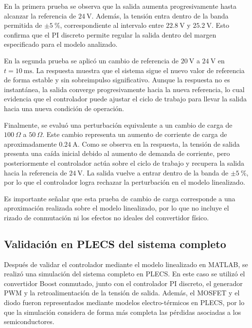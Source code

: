 \documentclass[conference]{IEEEtran}
\begin{document}
En la primera prueba se observa que la salida aumenta progresivamente hasta alcanzar la referencia de $24~\mathrm{V}$. Además, la tensión entra dentro de la banda permitida de $\pm 5~\%$, correspondiente al intervalo entre $22.8~\mathrm{V}$ y $25.2~\mathrm{V}$. Esto confirma que el PI discreto permite regular la salida dentro del margen especificado para el modelo analizado.

En la segunda prueba se aplicó un cambio de referencia de $20~\mathrm{V}$ a $24~\mathrm{V}$ en $t=10~\mathrm{ms}$. La respuesta muestra que el sistema sigue el nuevo valor de referencia de forma estable y sin sobreimpulso significativo. Aunque la respuesta no es instantánea, la salida converge progresivamente hacia la nueva referencia, lo cual evidencia que el controlador puede ajustar el ciclo de trabajo para llevar la salida hacia una nueva condición de operación.

Finalmente, se evaluó una perturbación equivalente a un cambio de carga de $100~\Omega$ a $50~\Omega$. Este cambio representa un aumento de corriente de carga de aproximadamente $0.24~\mathrm{A}$. Como se observa en la respuesta, la tensión de salida presenta una caída inicial debido al aumento de demanda de corriente, pero posteriormente el controlador actúa sobre el ciclo de trabajo y recupera la salida hacia la referencia de $24~\mathrm{V}$. La salida vuelve a entrar dentro de la banda de $\pm 5~\%$, por lo que el controlador logra rechazar la perturbación en el modelo linealizado.

Es importante señalar que esta prueba de cambio de carga corresponde a una aproximación realizada sobre el modelo linealizado, por lo que no incluye el rizado de conmutación ni los efectos no ideales del convertidor físico.


\subsection{Validación en PLECS del sistema completo}

Después de validar el controlador mediante el modelo linealizado en MATLAB, se realizó una simulación del sistema completo en PLECS. En este caso se utilizó el convertidor Boost conmutado, junto con el controlador PI discreto, el generador PWM y la retroalimentación de la tensión de salida. Además, el MOSFET y el diodo fueron representados mediante modelos electro-térmicos en PLECS, por lo que la simulación considera de forma más completa las pérdidas asociadas a los semiconductores.
\end{document}
